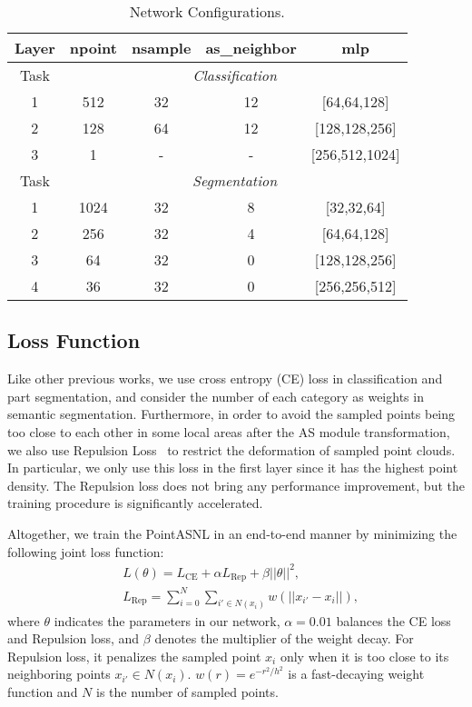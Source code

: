 \documentclass[10pt,twocolumn,letterpaper]{article}
\begin{document}
	\begin{table}[t]
		\small
		\renewcommand\tabcolsep{5.5pt} 
		\begin{center}
			\caption{Network Configurations.}
			\begin{tabular}{c|cccc}
				\hline
				Layer& npoint& nsample& as\_neighbor & mlp\\
				\hline
				\hline 
				Task		&	\multicolumn{4}{c}{\textit {Classification}}\\\hline
				1& 512&32&12&[64,64,128] \\	
				2& 128&64&12&[128,128,256]  \\
				3& 1&-&-&[256,512,1024]  \\\hline
				Task		&	\multicolumn{4}{c}{\textit {Segmentation}}\\\hline
				1& 1024&32&8&[32,32,64] \\	
				2& 256&32&4&[64,64,128]  \\
				
				3& 64&32&0& [128,128,256] \\	
				4& 36&32&0& [256,256,512] \\	
				\hline
				
			\end{tabular}
			\label{config}
		\end{center}
	\vspace{-0.3cm}
	\end{table}	
	\subsection{Loss Function}
	Like other previous works, we use cross entropy (CE) loss in classification and part segmentation, and consider the number of each category as weights in semantic segmentation. Furthermore, in order to avoid the sampled points being too close to each other in some local areas after the AS module transformation, we also use {{Repulsion Loss}}~\cite{PUNet} to restrict the deformation of sampled point clouds. In particular, we only use this loss in the first layer since it has the highest point density. The Repulsion loss does not bring any performance improvement, but the training procedure is significantly accelerated.
	
	Altogether, we train the PointASNL in an end-to-end manner by minimizing the following joint loss function:
	\begin{equation}
	\begin{split}
	&L(\theta) = L_{{\text{CE}}} + \alpha L_{{\text{Rep}}} + \beta||\theta||^2,\\
	&L_{{\text{Rep}}} = \sum^N_{i=0}\sum_{i'\in N(x_i)} w(||x_{i'} - x_i||), 
	\end{split}
	\end{equation}
	where $\theta$ indicates the parameters in our network, $\alpha= 0.01$ balances the CE loss and Repulsion loss, and $\beta$ denotes the multiplier of the weight decay. For Repulsion loss, it penalizes the sampled point $x_i$ only when it is too close to its neighboring points $x_{i'}\in N(x_i)$. $w(r) = e^{−r^2 /h^2}$ is a fast-decaying weight function and $N$ is the number of sampled points.
	
\end{document}

